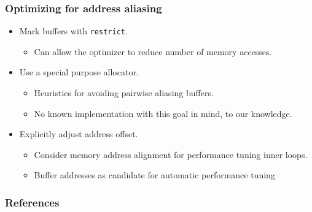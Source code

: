 \documentclass{beamer}
\begin{document}
\begin{frame}
\frametitle{Optimizing for address aliasing}


\begin{itemize}
  \item Mark buffers with \texttt{restrict}.
  \begin{itemize}
    \item Can allow the optimizer to reduce number of memory accesses.
  \end{itemize}
  \item Use a special purpose allocator.
  \begin{itemize}
    \item Heuristics for avoiding pairwise aliasing buffers.
    \item No known implementation with this goal in mind, to our knowledge.
  \end{itemize}
  \item Explicitly adjust address offset.
  \begin{itemize}
    \item Consider memory address alignment for performance tuning inner loops.
    \item Buffer addresses as candidate for automatic performance tuning
  \end{itemize}
\end{itemize}

\end{frame}


\begin{frame}

\frametitle{References}

\scriptsize{}


\end{frame}
\end{document}
